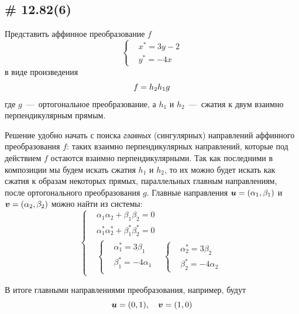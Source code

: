 \documentclass[a4paper,12pt]{article}
\begin{document}
  
  \subsection{\# 12.82(6)}
  
  Представить аффинное преобразование $f$
  \[
    \left\{
      \begin{aligned}
        &x^* = 3y - 2\\
        &y^* = -4x
      \end{aligned}
    \right.
  \]
  в виде произведения
  \begin{equation}
    \label{eq:composition}
    f \hm= h_2 h_1 g
  \end{equation}
  где $g$~---~ортогональное преобразование, а $h_1$ и $h_2$~---~сжатия к двум взаимно перпендикулярным прямым.
  
  \begin{solution}
    Решение удобно начать с поиска \emph{главных} (сингулярных) направлений аффинного преобразования $f$: таких взаимно перпендикулярных направлений, которые под действием $f$ остаются взаимно перпендикулярными.
    Так как последними в композиции мы будем искать сжатия $h_1$ и $h_2$, то их можно будет искать как сжатия к образам некоторых прямых, параллельных главным направлениям, после ортогонального преобразования $g$.
    Главные направления $\bds u \hm= (\alpha_1, \beta_1)$ и $\bds v \hm= (\alpha_2, \beta_2)$ можно найти из системы:
    \[
      \left\{
        \begin{aligned}
          &\alpha_1 \alpha_2 + \beta_1 \beta_2 = 0\\
          &\alpha_1^* \alpha_2^* + \beta_1^* \beta_2^* = 0\\
          &\left\{
            \begin{aligned}
              &\alpha_1^* = 3\beta_1\\
              &\beta_1^* = -4\alpha_1\\
            \end{aligned}
          \right.
          \quad\left\{
            \begin{aligned}
              &\alpha_2^* = 3\beta_2\\
              &\beta_2^* = -4\alpha_2
            \end{aligned}
          \right.
        \end{aligned}
      \right.
    \]
    
    В итоге главными направлениями преобразования, например, будут
    \[
      \boldsymbol u = (0, 1),\quad \boldsymbol v = (1, 0)
    \]


\end{solution}
\end{document}
